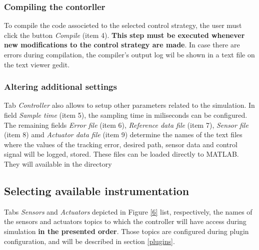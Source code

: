 \subsubsection{Compiling the contorller}

To compile the code associeted to the selected control strategy, the user must click the button \textit{Compile} (item 4). \textbf{This step must be executed whenever new modifications to the control strategy are made}. In case there are errors during compilation, the compiler's output log wil be shown in a text file on the text viewer gedit.

\subsubsection{Altering additional settings}

Tab \textit{Controller} also allows to setup other parameters related to the simulation. In field \textit{Sample time} (item 5), the sampling time in miliseconds can be configured. The remaining fields \textit{Error file} (item 6), \textit{Reference data file} (item 7), \textit{Sensor file} (item 8) amd \textit{Actuator data file} (item 9) determine the names of the text files where the values of the tracking error, desired path, sensor data and control signal will be logged, stored. These files can be loaded directly to MATLAB. They will available in the directory

\subsection{Selecting available instrumentation}
\label{sensoresatuadores}

Tabs \textit{Sensors} and \textit{Actuators} depicted in Figure \ref{6} list, respectively, the names of the sensors and actuators topics to which the controller will have access during simulation \textbf{in the presented order}. Those topics are configured during plugin configuration, and will be described in section \ref{plugins}. 

